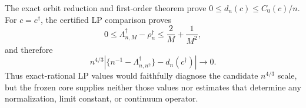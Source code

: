 The exact orbit reduction and first-order theorem prove \(0\le d_n(c)\le C_0(c)/n\).  For \(c=c^\dagger\), the certified LP comparison proves
\[
 0\le \Lambda_{n,M}^\dagger-\rho_n^\dagger
 \le \frac2M+\frac1{M^2},
\]
and therefore
\[
 n^{4/3}\left|\{n^{-1}-\Lambda_{n,n^2}^\dagger\}
 -d_n(c^\dagger)\right|\longrightarrow0.
\]
Thus exact-rational LP values would faithfully diagnose the candidate \(n^{4/3}\) scale, but the frozen core supplies neither those values nor estimates that determine any normalization, limit constant, or continuum operator.